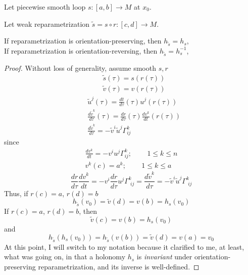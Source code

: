 \begin{lemma} 
	Let piecewise smooth loop $s:[a,b] \to M$ at $x_0$.  

Let weak reparametrization $\widetilde{s} = s\circ r: [c,d] \to M$.  

If reparametrization is orientation-preserving, then $h_{\widetilde{s}} = h_s$, \\
If reparametrization is orientation-reversing, then $h_{\widetilde{s}} = h^{-1}_s$, 

\end{lemma}
\begin{proof}
	Without loss of generality,  assume smooth $s,r$
\[
\begin{aligned}
	& \widetilde{s}(\tau) = s(r(\tau)) \\ 
	& \widetilde{v}(\tau) = v(r(\tau))
\end{aligned}
\]
\[
\begin{aligned}
	& \widetilde{u}^j(\tau) = \frac{dt}{d\tau}(\tau) u^j(r(\tau)) \\ 
	& \frac{d\widetilde{v}^k}{d\tau} (\tau) = \frac{dr}{d\tau}(\tau) \frac{dv^k}{dt}(r(\tau)) \\ 
	& \frac{d\widetilde{v}^k }{ d\tau} = -\widetilde{v}^i \widetilde{u}^j \Gamma^k_{ij} 
\end{aligned}
\]
since \[
\begin{gathered}
	\frac{dv^k}{dt} = -v^i u^j \Gamma^k_{ij} ; \qquad \, 1\leq k \leq n \\ 
v^k(c) = a^k; \qquad \, 1\leq k \leq a 
\end{gathered}
\]
\[
\frac{dr}{d\tau} \frac{dv^k}{ dt} = -v^i \frac{dr}{d\tau} u^j \Gamma^k_{ \, \, ij} = \frac{d\widetilde{v}^k}{d\tau} = -\widetilde{v}^i \widetilde{u}^j \Gamma^k_{ \, \, ij}
\]
Thus, if $r(c) = a$, $r(d)=b$
\[
h_{\widetilde{s}}(v_0) = \widetilde{v}(d) = v(b) = h_s(v_0)
\]
If $r(c)=a$, $r(d)=b$, then 
\[
\widetilde{v}(c) = v(b) = h_s(v_0)
\]
and 
\[
h_{\widetilde{s}}(h_s(v_0)) = h_{\widetilde{s}}(v(b)) = \widetilde{v}(d) = v(a) = v_0
\]
At this point, I will switch to my notation because it clarified to me, at least, what was going on, in that a holonomy $h_s$ is \emph{invariant} under orientation-preserving reparametrization, and its inverse is well-defined.  


\end{proof}
